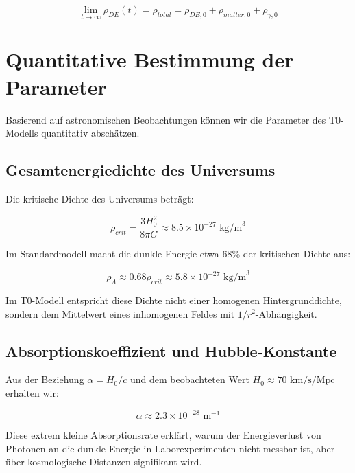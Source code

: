 \documentclass[a4paper,12pt]{article}
\begin{document}
\begin{equation}
	\lim_{t \rightarrow \infty} \rho_{DE}(t) = \rho_{total} = \rho_{DE,0} + \rho_{matter,0} + \rho_{\gamma,0}
\end{equation}

\section{Quantitative Bestimmung der Parameter}

Basierend auf astronomischen Beobachtungen können wir die Parameter des T0-Modells quantitativ abschätzen.

\subsection{Gesamtenergiedichte des Universums}

Die kritische Dichte des Universums beträgt:

\begin{equation}
	\rho_{crit} = \frac{3H_0^2}{8\pi G} \approx 8.5 \times 10^{-27} \text{ kg/m}^3
\end{equation}

Im Standardmodell macht die dunkle Energie etwa 68\% der kritischen Dichte aus:

\begin{equation}
	\rho_{\Lambda} \approx 0.68 \rho_{crit} \approx 5.8 \times 10^{-27} \text{ kg/m}^3
\end{equation}

Im T0-Modell entspricht diese Dichte nicht einer homogenen Hintergrunddichte, sondern dem Mittelwert eines inhomogenen Feldes mit $1/r^2$-Abhängigkeit.

\subsection{Absorptionskoeffizient und Hubble-Konstante}

Aus der Beziehung $\alpha = H_0/c$ und dem beobachteten Wert $H_0 \approx 70 \text{ km/s/Mpc}$ erhalten wir:

\begin{equation}
	\alpha \approx 2.3 \times 10^{-28} \text{ m}^{-1}
\end{equation}

Diese extrem kleine Absorptionsrate erklärt, warum der Energieverlust von Photonen an die dunkle Energie in Laborexperimenten nicht messbar ist, aber über kosmologische Distanzen signifikant wird.
\end{document}

